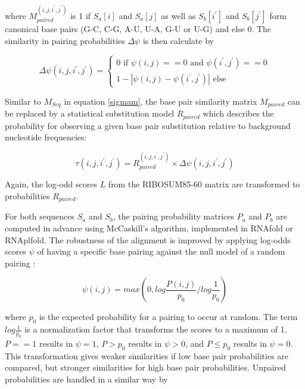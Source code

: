 \documentclass{bmcart}
\begin{document}
\noindent where $M_{paired}^{(i,j,i^\prime,j^\prime)}$ is 1 if $S_a[i]$ and $S_a[j]$ as
well as $S_b[i^\prime]$ and $S_b[j^\prime]$ form canonical base pairs (G-C, C-G,
A-U, U-A, G-U or U-G) and else 0. The similarity in pairing probabilities
$\Delta \psi$ is then calculate by

\begin{equation}\label{eq9}
	\Delta \psi(i,j,i^\prime,j^\prime) = \left\{ \begin{array}{l}
			0 \textrm{ if }\psi(i,j) == 0 
			  \textrm{ and }\psi(i^\prime,j^\prime) == 0 \\
		1 - | \psi(i,j) - \psi(i^\prime,j^\prime) | \textrm{ else}
		\end{array}\right.
\end{equation}

\noindent Similar to $M_{Seq}$ in equation \ref{sigmam}, the base pair similarity matrix
$M_{paired}$ can be replaced by a statistical substitution model $R_{paired}$
which describes the probability for observing a given base pair substitution
relative to background nucleotide frequencies:

\begin{equation}\label{eq10}
	\tau(i,j,i^\prime,j^\prime) = R_{paired}^{(i,j,i^\prime,j^\prime)}
\times \Delta \psi(i,j,i^\prime,j^\prime)
\end{equation}

\noindent Again, the log-odd scores $L$ from the RIBOSUM85-60 matrix \cite{Klein14499004}
are transformed to probabilities $R_{paired}$.

\noindent For both sequences $S_a$ and $S_b$, the pairing probability matrices $P_a$ and
$P_b$ are computed in advance using McCaskill's algorithm, implemented in
RNAfold or RNAplfold. The robustness of the alignment is improved by applying
log-odds scores $\psi$ of having a specific base pairing against the null model
of a random pairing \cite{Will17432929}:

\begin{equation}\label{eq11}
	\psi(i,j) = max \left( 0, log \frac{P(i,j)}{p_0} / log \frac{1}{p_0} \right)
\end{equation}

\noindent where $p_0$ is the expected probability for a pairing to occur at random. The
term $log \frac{1}{p_0}$ is a normalization factor that transforms the scores to
a maximum of 1. $P==1$ results in $\psi=1$, $P>p_0$ results in $\psi>0$, and $P\le
p_0$ results in $\psi=0$.  This transformation gives weaker similarities if low
base pair probabilities are compared, but stronger similarities for high base pair
probabilities. Unpaired probabilities are handled in a similar way by
\end{document}
